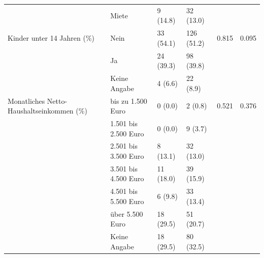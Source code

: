 \begin{table}[!h]
{\begin{tabular}[t]{llllll}
 & Miete & 9 (14.8) & 32 (13.0) &  & \\
Kinder unter 14 Jahren (\%) & Nein & 33 (54.1) & 126 (51.2) & 0.815 & 0.095\\
 & Ja & 24 (39.3) & 98 (39.8) &  & \\
 & Keine Angabe & 4 (6.6) & 22 (8.9) &  & \\
Monatliches Netto-Haushaltseinkommen (\%) & bis zu 1.500 Euro & 0 (0.0) & 2 (0.8) & 0.521 & 0.376\\
 & 1.501 bis 2.500 Euro & 0 (0.0) & 9 (3.7) &  & \\
 & 2.501 bis 3.500 Euro & 8 (13.1) & 32 (13.0) &  & \\
 & 3.501 bis 4.500 Euro & 11 (18.0) & 39 (15.9) &  & \\
 & 4.501 bis 5.500 Euro & 6 (9.8) & 33 (13.4) &  & \\
 & über 5.500 Euro & 18 (29.5) & 51 (20.7) &  & \\
 & Keine Angabe & 18 (29.5) & 80 (32.5) &  & \\
\bottomrule
\end{tabular}}
\end{table}
